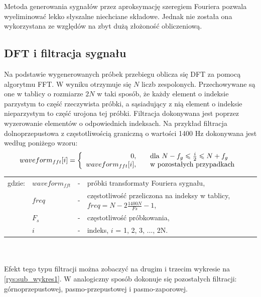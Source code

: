 Metoda generowania sygnałów przez aproksymację szeregiem Fouriera pozwala wyeliminować lekko słyszalne niechciane składowe. Jednak nie została ona wykorzystana ze względów na zbyt dużą złożoność obliczeniową. 

\subsection{DFT i filtracja sygnału}
Na podstawie wygenerowanych próbek przebiegu oblicza się DFT za pomocą algorytmu FFT. W wyniku otrzymuje się $N$ liczb zespolonych. Przechowywane są one w tablicy o rozmiarze $2N$ w taki sposób, że każdy element o indeksie parzystym to część rzeczywista próbki, a sąsiadujący z nią element o indeksie nieparzystym to część urojona tej próbki. Filtracja dokonywana jest poprzez wyzerowanie elementów o odpowiednich indeksach. Na przykład filtracja dolnoprzepustowa z częstotliwością graniczną o wartości 1400 Hz dokonywana jest według poniżego wzoru:
\begin{equation} \label{equ:sub_3}
waveform_{fft}[i]=\left \{\begin{array}{ r l }
0, & \quad  \text{dla } N - f_g \leqslant \frac{i}{2} \leqslant N + f_g \\
waveform_{fft}[i], & \quad \text{w pozostałych przypadkach } 

\end{array}
\right.
\end{equation}
\begin{tabular}{ l l l l}
	gdzie: & $waveform_{fft}$ &  - & próbki transformaty Fouriera sygnału, \\
	&	$freq$ & - &  częstotliwość przeliczona na indeksy w tablicy, $freq = N - 2 \frac{1400N}{Fs} - 1$, \\
	&	$F_s$ & - & częstotliwość próbkowania,\\
	&	$i$ & - &  indeks, $i$ = 1, 2, 3, ..., 2N.\\
\end{tabular} \\ \\

Efekt tego typu filtracji można zobaczyć na drugim i trzecim wykresie na \ref{rys:sub_wykres1}. W analogiczny sposób dokonuje się pozostałych filtracji: górnoprzepustowej, pasmo-przepustowej i pasmo-zaporowej.

